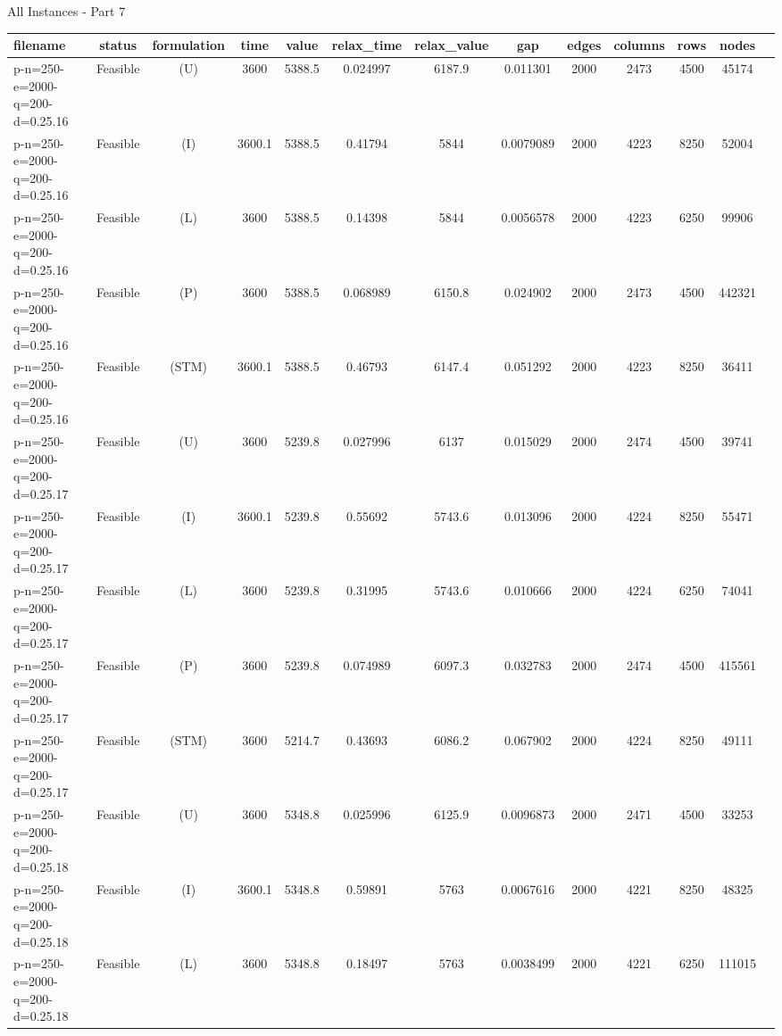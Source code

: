\documentclass[landscape, a4paper]{article}
\newcommand{\STM}{\ensuremath{\mathrm{STM}}}
\newcommand{\Improved}{\ensuremath{\mathrm{I}}}
\newcommand{\Loose}{\ensuremath{\mathrm{L}}}
\newcommand{\Profit}{\ensuremath{\mathrm{P}}}
\newcommand{\Utility}{\ensuremath{\mathrm{U}}}
\begin{document}
\begin{center}
\newpage
All Instances - Part 7

\begin{tabular}{lcccccccccccc}
filename & status & formulation & time & value & relax\_time & relax\_value & gap & edges & columns & rows & nodes & \\
\hline
p-n=250-e=2000-q=200-d=0.25.16 & Feasible & (\Utility) & 3600 & 5388.5 & 0.024997 & 6187.9 & 0.011301 & 2000 & 2473 & 4500 & 45174 & \\
p-n=250-e=2000-q=200-d=0.25.16 & Feasible & (\Improved) & 3600.1 & 5388.5 & 0.41794 & 5844 & 0.0079089 & 2000 & 4223 & 8250 & 52004 & \\
p-n=250-e=2000-q=200-d=0.25.16 & Feasible & (\Loose) & 3600 & 5388.5 & 0.14398 & 5844 & 0.0056578 & 2000 & 4223 & 6250 & 99906 & \\
p-n=250-e=2000-q=200-d=0.25.16 & Feasible & (\Profit) & 3600 & 5388.5 & 0.068989 & 6150.8 & 0.024902 & 2000 & 2473 & 4500 & 442321 & \\
p-n=250-e=2000-q=200-d=0.25.16 & Feasible & (\STM) & 3600.1 & 5388.5 & 0.46793 & 6147.4 & 0.051292 & 2000 & 4223 & 8250 & 36411 & \\
p-n=250-e=2000-q=200-d=0.25.17 & Feasible & (\Utility) & 3600 & 5239.8 & 0.027996 & 6137 & 0.015029 & 2000 & 2474 & 4500 & 39741 & \\
p-n=250-e=2000-q=200-d=0.25.17 & Feasible & (\Improved) & 3600.1 & 5239.8 & 0.55692 & 5743.6 & 0.013096 & 2000 & 4224 & 8250 & 55471 & \\
p-n=250-e=2000-q=200-d=0.25.17 & Feasible & (\Loose) & 3600 & 5239.8 & 0.31995 & 5743.6 & 0.010666 & 2000 & 4224 & 6250 & 74041 & \\
p-n=250-e=2000-q=200-d=0.25.17 & Feasible & (\Profit) & 3600 & 5239.8 & 0.074989 & 6097.3 & 0.032783 & 2000 & 2474 & 4500 & 415561 & \\
p-n=250-e=2000-q=200-d=0.25.17 & Feasible & (\STM) & 3600 & 5214.7 & 0.43693 & 6086.2 & 0.067902 & 2000 & 4224 & 8250 & 49111 & \\
p-n=250-e=2000-q=200-d=0.25.18 & Feasible & (\Utility) & 3600 & 5348.8 & 0.025996 & 6125.9 & 0.0096873 & 2000 & 2471 & 4500 & 33253 & \\
p-n=250-e=2000-q=200-d=0.25.18 & Feasible & (\Improved) & 3600.1 & 5348.8 & 0.59891 & 5763 & 0.0067616 & 2000 & 4221 & 8250 & 48325 & \\
p-n=250-e=2000-q=200-d=0.25.18 & Feasible & (\Loose) & 3600 & 5348.8 & 0.18497 & 5763 & 0.0038499 & 2000 & 4221 & 6250 & 111015 & \\

\end{tabular}
\end{center}
\end{document}
